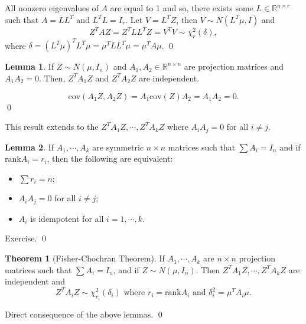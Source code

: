 \documentclass[
]{article}
\theoremstyle{definition}
\newtheorem{theorem}{Theorem}
\theoremstyle{definition}
\newtheorem{lemma}{Lemma}[section]
\begin{document}
All nonzero eigenvalues of \(A\) are equal to 1 and so, there exists
some \(L \in \mathbb{R}^{n \times r}\) such that \(A = LL^T\) and
\(L^T L = I_r\). Let \(V = L^T Z\), then \(V \sim N(L^T \mu, I)\) and
\[Z^T A Z = Z^T LL^T Z = V^T V \sim \chi_r^2(\delta),\] where
\(\delta = (L^T \mu)^T L^T \mu = \mu^T LL^T \mu = \mu^T A \mu\). \qed

\begin{lemma}
  If \(Z \sim N(\mu, I_n)\) and \(A_1, A_2 \in \mathbb{R}^{n \times n}\) are projection 
  matrices and \(A_1A_2 = 0\). Then, \(Z^TA_1 Z\) and \(Z^TA_2 Z\) are independent.
\end{lemma}
\proof

\[\text{cov}(A_1 Z, A_2 Z) = A_1 \text{cov}(Z) A_2 = A_1 A_2 = 0.\] \qed

This result extends to the \(Z^T A_1 Z, \cdots, Z^T A_k Z\) where
\(A_i A_j = 0\) for all \(i \neq j\).

\begin{lemma}
  If \(A_1, \cdots, A_k\) are symmetric \(n \times n\) matrices such that \(\sum A_i = I_n\) 
  and if \(\text{rank} A_i = r_i\), then the following are equivalent:
  \begin{itemize}
    \item \(\sum r_i = n\);
    \item \(A_i A_j = 0\) for all \(i \neq j\);
    \item \(A_i\) is idempotent for all \(i = 1, \cdots, k\).
  \end{itemize}
\end{lemma}
\proof

Exercise. \qed

\begin{theorem}[Fisher-Chochran Theorem]
  If \(A_1, \cdots, A_k\) are \(n \times n\) projection matrices such that 
  \(\sum A_i = I_n\), and if \(Z \sim N(\mu, I_n)\). Then \(Z^T A_1 Z, \cdots, Z^T A_k Z\)
  are independent and 
  \[Z^T A_i Z \sim \chi_{r_i}^2(\delta_i) \text{ where } r_i = \text{rank} A_i \text{ and } 
  \delta_i^2 = \mu^T A_i \mu.\]
\end{theorem}
\proof

Direct consequence of the above lemmas. \qed
\end{document}

